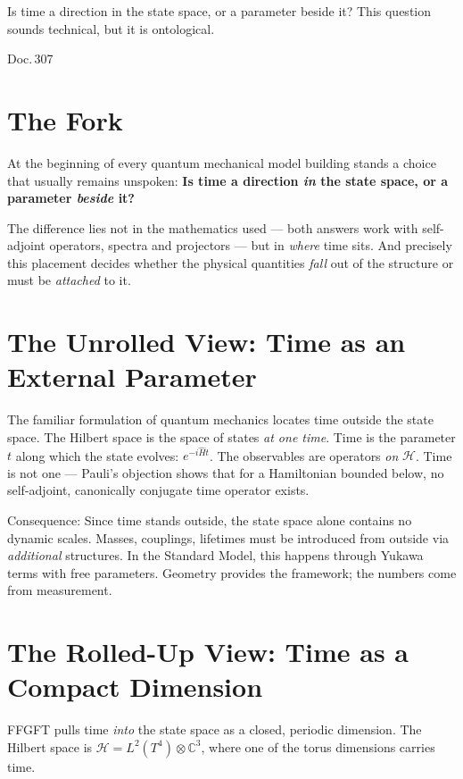 \label{ch:zeit_zustandsraum}

\epigraph{Is time a direction in the state space,
or a parameter beside it?
This question sounds technical, but it is ontological.}{Doc.\,307}

\section{The Fork}

At the beginning of every quantum mechanical model building stands a choice that usually
remains unspoken: \textbf{Is time a direction \emph{in} the
state space, or a parameter \emph{beside} it?}

The difference lies not in the mathematics used --- both answers
work with self-adjoint operators, spectra and projectors ---
but in \emph{where} time sits. And precisely this placement decides
whether the physical quantities \emph{fall} out of the structure or
must be \emph{attached} to it.

\section{The Unrolled View: Time as an External Parameter}

The familiar formulation of quantum mechanics locates time outside the
state space. The Hilbert space is the space of states \emph{at one
time}. Time is the parameter $t$ along which the state
evolves: $e^{-i\hat{H}t}$. The observables are operators \emph{on}
$\mathcal{H}$. Time is not one --- Pauli's objection shows that for a
Hamiltonian bounded below, no self-adjoint, canonically conjugate
time operator exists.

Consequence: Since time stands outside, the state space alone
contains no dynamic scales. Masses, couplings, lifetimes must be introduced
from outside via \emph{additional} structures. In the Standard Model,
this happens through Yukawa terms with free parameters. Geometry provides
the framework; the numbers come from measurement.

\section{The Rolled-Up View: Time as a Compact Dimension}

FFGFT pulls time \emph{into} the state space as a closed,
periodic dimension. The Hilbert space is $\mathcal{H} = L^2(T^4) \otimes
\mathbb{C}^3$, where one of the torus dimensions carries time.

